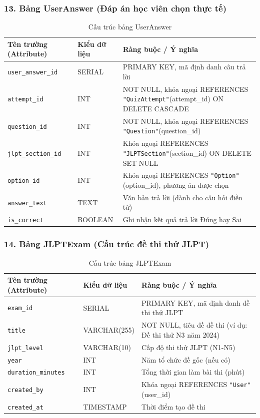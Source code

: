 \documentclass[../DoAn.tex]{subfiles}
\begin{document}
\subsubsection*{13. Bảng UserAnswer (Đáp án học viên chọn thực tế)}
\begin{table}[H]
\centering
\footnotesize
\renewcommand{\arraystretch}{1.2}
\begin{tabular}{|p{4.2cm}|p{3.2cm}|p{7.1cm}|}
\hline
\textbf{Tên trường (Attribute)} & \textbf{Kiểu dữ liệu} & \textbf{Ràng buộc / Ý nghĩa} \\
\hline
\texttt{user\_answer\_id} & SERIAL & PRIMARY KEY, mã định danh câu trả lời \\
\hline
\texttt{attempt\_id} & INT & NOT NULL, khóa ngoại REFERENCES \texttt{"QuizAttempt"}(attempt\_id) ON DELETE CASCADE \\
\hline
\texttt{question\_id} & INT & NOT NULL, khóa ngoại REFERENCES \texttt{"Question"}(question\_id) \\
\hline
\texttt{jlpt\_section\_id} & INT & Khóa ngoại REFERENCES \texttt{"JLPTSection"}(section\_id) ON DELETE SET NULL \\
\hline
\texttt{option\_id} & INT & Khóa ngoại REFERENCES \texttt{"Option"}(option\_id), phương án được chọn \\
\hline
\texttt{answer\_text} & TEXT & Văn bản trả lời (dành cho câu hỏi điền từ) \\
\hline
\texttt{is\_correct} & BOOLEAN & Ghi nhận kết quả trả lời Đúng hay Sai \\
\hline
\end{tabular}
\caption{Cấu trúc bảng UserAnswer}
\label{tab:schema_useranswer}
\end{table}

\subsubsection*{14. Bảng JLPTExam (Cấu trúc đề thi thử JLPT)}
\begin{table}[H]
\centering
\footnotesize
\renewcommand{\arraystretch}{1.2}
\begin{tabular}{|p{4.2cm}|p{3.2cm}|p{7.1cm}|}
\hline
\textbf{Tên trường (Attribute)} & \textbf{Kiểu dữ liệu} & \textbf{Ràng buộc / Ý nghĩa} \\
\hline
\texttt{exam\_id} & SERIAL & PRIMARY KEY, mã định danh đề thi thử JLPT \\
\hline
\texttt{title} & VARCHAR(255) & NOT NULL, tiêu đề đề thi (ví dụ: Đề thi thử N3 năm 2024) \\
\hline
\texttt{jlpt\_level} & VARCHAR(10) & Cấp độ thi thử JLPT (N1-N5) \\
\hline
\texttt{year} & INT & Năm tổ chức đề gốc (nếu có) \\
\hline
\texttt{duration\_minutes} & INT & Tổng thời gian làm bài thi (phút) \\
\hline
\texttt{created\_by} & INT & Khóa ngoại REFERENCES \texttt{"User"}(user\_id) \\
\hline
\texttt{created\_at} & TIMESTAMP & Thời điểm tạo đề thi \\
\hline
\end{tabular}
\caption{Cấu trúc bảng JLPTExam}
\label{tab:schema_jlptexam}
\end{table}
\end{document}
